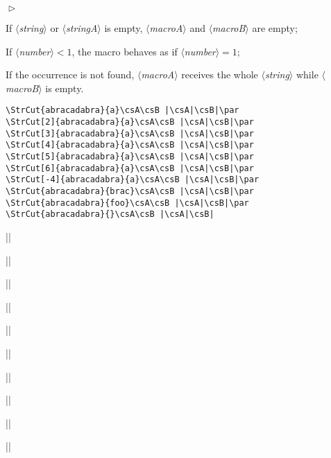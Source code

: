 \documentclass[a4paper,10pt]{article}
\newcommand\argu[1]{$\langle$\textit{#1}$\rangle$}
\newenvironment{Conditions}[1][1cm]%
{\begin{list}%
	{$\vartriangleright$}%
	{\setlength{\leftmargin}{#1}
	 \setlength{\itemsep}{0pt}
	 \setlength{\parsep}{0pt}
	 \setlength{\topsep}{2ptplus3ptminus2pt}
	}}%
{\end{list}}
\newcommand\styleexemple{\small\vskip4pt}
\begin{document}
\begin{Conditions}
	\item If \argu{string} or \argu{stringA} is empty, \argu{macroA} and \argu{macroB} are empty;
	\item If \argu{number}${}<1$, the macro behaves as if \argu{number}${}=1$;
	\item If the occurrence is not found, \argu{macroA} receives the whole \argu{string} while \argu{macroB} is empty.
\end{Conditions}
\begin{minipage}[t]{0.65\linewidth}
\begin{lstlisting}
\StrCut{abracadabra}{a}\csA\csB |\csA|\csB|\par
\StrCut[2]{abracadabra}{a}\csA\csB |\csA|\csB|\par
\StrCut[3]{abracadabra}{a}\csA\csB |\csA|\csB|\par
\StrCut[4]{abracadabra}{a}\csA\csB |\csA|\csB|\par
\StrCut[5]{abracadabra}{a}\csA\csB |\csA|\csB|\par
\StrCut[6]{abracadabra}{a}\csA\csB |\csA|\csB|\par
\StrCut[-4]{abracadabra}{a}\csA\csB |\csA|\csB|\par
\StrCut{abracadabra}{brac}\csA\csB |\csA|\csB|\par
\StrCut{abracadabra}{foo}\csA\csB |\csA|\csB|\par
\StrCut{abracadabra}{}\csA\csB |\csA|\csB|
\end{lstlisting}%
\end{minipage}\hfill
\begin{minipage}[t]{0.35\linewidth}
	\def\seprouge{{\color{red}|}}
	\styleexemple
	\csA\csB |\csA\seprouge\csB|\par
	\csA\csB |\csA\seprouge\csB|\par
	\csA\csB |\csA\seprouge\csB|\par
	\csA\csB |\csA\seprouge\csB|\par
	\csA\csB |\csA\seprouge\csB|\par
	\csA\csB |\csA\seprouge\csB|\par
	\csA\csB |\csA\seprouge\csB|\par
	\csA\csB |\csA\seprouge\csB|\par
	\csA\csB |\csA\seprouge\csB|\par
	\csA\csB |\csA\seprouge\csB|
\end{minipage}%
\end{document}
